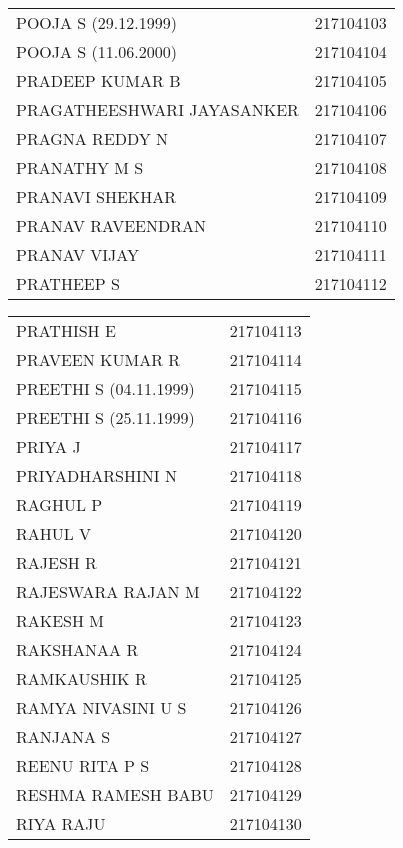 \documentclass[11pt]{article}
\begin{document}
\begin{center}
\begin{tabular}{lr}
POOJA S (29.12.1999) & 217104103\\
POOJA S (11.06.2000) & 217104104\\
PRADEEP KUMAR B & 217104105\\
PRAGATHEESHWARI JAYASANKER & 217104106\\
PRAGNA REDDY N & 217104107\\
PRANATHY M S & 217104108\\
PRANAVI SHEKHAR & 217104109\\
PRANAV RAVEENDRAN & 217104110\\
PRANAV VIJAY & 217104111\\
PRATHEEP S & 217104112\\
\end{tabular}
\end{center}


\begin{center}
\begin{tabular}{lr}
PRATHISH E & 217104113\\
PRAVEEN KUMAR R & 217104114\\
PREETHI S (04.11.1999) & 217104115\\
PREETHI S (25.11.1999) & 217104116\\
PRIYA J & 217104117\\
PRIYADHARSHINI N & 217104118\\
RAGHUL P & 217104119\\
RAHUL V & 217104120\\
RAJESH R & 217104121\\
RAJESWARA RAJAN M & 217104122\\
RAKESH M & 217104123\\
RAKSHANAA R & 217104124\\
RAMKAUSHIK R & 217104125\\
RAMYA NIVASINI U S & 217104126\\
RANJANA S & 217104127\\
REENU RITA P S & 217104128\\
RESHMA RAMESH BABU & 217104129\\
RIYA RAJU & 217104130\\
\end{tabular}
\end{center}
\end{document}
